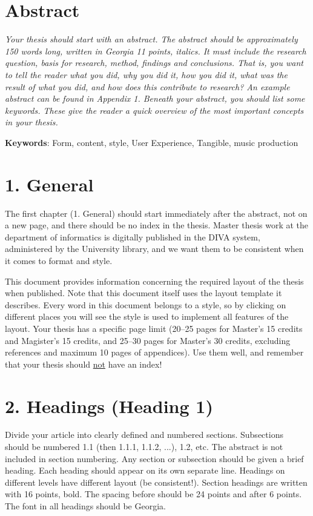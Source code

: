 \documentclass[]{article}
\author{}
\date{}
\begin{document}
\section*{\centering Abstract}

\emph{Your thesis should start with an abstract. The abstract should be
approximately 150 words long, written in Georgia 11 points, italics. It
must include the research question, basis for research, method, findings
and conclusions. That is, you want to tell the reader what you did, why
you did it, how you did it, what was the result of what you did, and how
does this contribute to research? An example abstract can be found in
Appendix 1. Beneath your abstract, you should list some keywords. These
give the reader a quick overview of the most important concepts in your
thesis.}

\textbf{Keywords}: Form, content, style, User Experience, Tangible,
music production

\section{1. General}\label{general}

The first chapter (1. General) should start immediately after the
abstract, not on a new page, and there should be no index in the thesis.
Master thesis work at the department of informatics is digitally
published in the DIVA system, administered by the University library, and
we want them to be consistent when it comes to format and style.

This document provides information concerning the required layout of the
thesis when published. Note that this document itself uses the layout
template it describes. Every word in this document belongs to a style, so
by clicking on different places you will see the style is used to
implement all features of the layout. Your thesis has a specific page
limit (20–25 pages for Master's 15 credits and Magister's 15 credits,
and 25–30 pages for Master's 30 credits, excluding references and
maximum 10 pages of appendices). Use them well, and remember that your
thesis should \ul{not} have an index!

\section{2. Headings (Heading 1)}\label{headings-heading-1}

Divide your article into clearly defined and numbered sections.
Subsections should be numbered 1.1 (then 1.1.1, 1.1.2, ...), 1.2, etc.
The abstract is not included in section numbering. Any section or
subsection should be given a brief heading. Each heading should appear
on its own separate line. Headings on different levels have different
layout (be consistent!). Section headings are written with 16 points,
bold. The spacing before should be 24 points and after 6 points. The
font in all headings should be Georgia.
\end{document}

